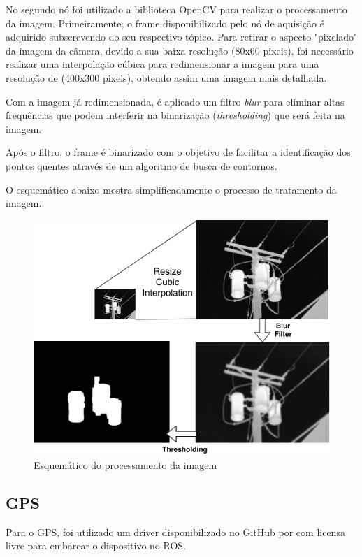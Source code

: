      No segundo nó foi utilizado a biblioteca OpenCV para realizar o processamento da imagem. Primeiramente, o frame disponibilizado pelo nó de aquisição é adquirido subscrevendo do seu respectivo tópico. Para retirar o aspecto "pixelado" da imagem da câmera, devido a sua baixa resolução (80x60 pixeis), foi necessário realizar uma interpolação cúbica para redimensionar a imagem para uma resolução de (400x300 pixeis), obtendo assim uma imagem mais detalhada. 
     
     Com a imagem já redimensionada, é aplicado um filtro \textit{blur} para eliminar altas frequências que podem interferir na binarização (\textit{thresholding}) que será feita na imagem.
     
     Após o filtro, o frame é binarizado com o objetivo de facilitar a identificação dos pontos quentes através de um algoritmo de busca de contornos.
     
     O esquemático abaixo mostra simplificadamente o processo de tratamento da imagem.
     
    \begin{figure}[!ht]
    	\centering
    	\includegraphics[width=14cm]{Figures/image_proc.png}
    	\caption{Esquemático do processamento da imagem} \label{imgproc}
	\end{figure}
     
     \subsection{GPS}
     
     Para o GPS, foi utilizado um driver disponibilizado no GitHub por  com licensa livre para embarcar o dispositivo no ROS.
     

